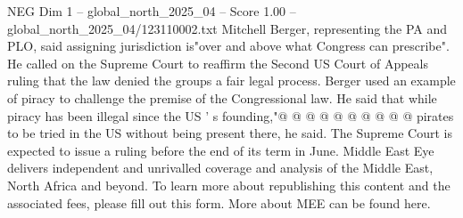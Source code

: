 \begin{textsample}{NEG Dim 1 – global\_north\_2025\_04 – Score 1.00 – global\_north\_2025\_04/123110002.txt}
Mitchell Berger, representing the PA and PLO, said assigning jurisdiction is"over and above what Congress can prescribe".
He called on the Supreme Court to reaffirm the Second US Court of Appeals ruling that the law denied the groups a fair legal process.
Berger used an example of piracy to challenge the premise of the Congressional law.
He said that while piracy has been illegal since the US ' s founding,"@ @ @ @ @ @ @ @ @ @ pirates to be tried in the US without being present there, he said.
The Supreme Court is expected to issue a ruling before the end of its term in June.
Middle East Eye delivers independent and unrivalled coverage and analysis of the Middle East, North Africa and beyond.
To learn more about republishing this content and the associated fees, please fill out this form.
More about MEE can be found here.

\end{textsample}
